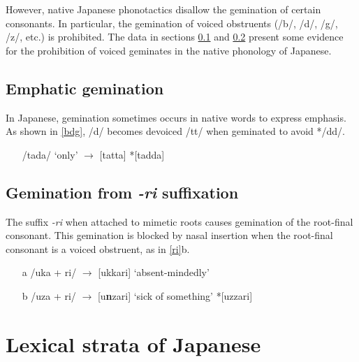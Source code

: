 \documentclass{article}
\begin{document}
However, native Japanese phonotactics disallow the gemination of certain consonants. In particular, the gemination of voiced obstruents (/b/, /d/, /g/, /z/, etc.) is prohibited. The data in sections \ref{emph} and \ref{-ri} present some evidence for the prohibition of voiced geminates in the native phonology of Japanese.

\subsection{Emphatic gemination}
\label{emph}

In Japanese, gemination sometimes occurs in native words to express emphasis. As shown in \ref{bdg}, /d/ becomes devoiced /tt/ when geminated to avoid */dd/. \citep[p. 3]{Kubozono2009}

\begin{exe}
    \ex
    \label{bdg}
    \begin{itemize}
        \item [] /tada/ ‘only' $\rightarrow$ [tatta] \hspace{1cm} *[tadda]
    \end{itemize}
\end{exe}

\subsection{Gemination from \textit{-ri} suffixation}
\label{-ri}

The suffix \textit{-ri} when attached to mimetic roots causes gemination of the root-final consonant. This gemination is blocked by nasal insertion when the root-final consonant is a voiced obstruent, as in \ref{ri}b. \citep[p. 1]{Kawahara2015}

\begin{exe}
    \ex
    \label{ri}
    \begin{itemize}
        \item [a] /uka + ri/ $\rightarrow$ [ukkari] ‘absent-mindedly'
        \item [b] /uza + ri/ $\rightarrow$ [u\textbf{n}zari] ‘sick of something' \hspace{1cm} *[uzzari]
    \end{itemize}
\end{exe}

\section{Lexical strata of Japanese}
\label{lexical strata}
\end{document}
